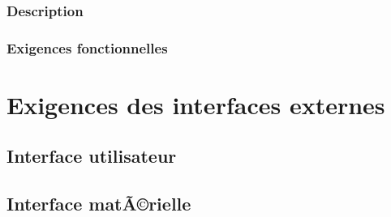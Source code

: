 \documentclass[a4paper, french, 10pt]{report}
\begin{document}
	\subsubsection{Description}

	\subsubsection{Exigences fonctionnelles}





\section{Exigences des interfaces externes}
	\subsection{Interface utilisateur}

	\subsection{Interface matÃ©rielle}
\end{document}
